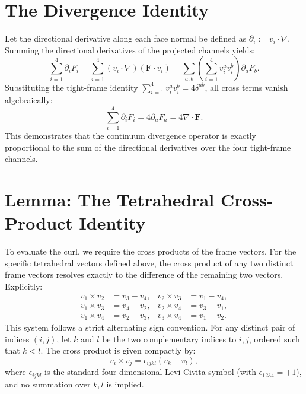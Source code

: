 \documentclass[11pt, letterpaper]{article}
\begin{document}
\section{The Divergence Identity}
Let the directional derivative along each face normal be defined as \(\partial_i := v_i \cdot \nabla\). Summing the directional derivatives of the projected channels yields:
\begin{equation}
    \sum_{i=1}^4 \partial_i F_i
    =
    \sum_{i=1}^4 (v_i \cdot \nabla)(\mathbf{F} \cdot v_i)
    =
    \sum_{a,b} \left( \sum_{i=1}^4 v_i^a v_i^b \right) \partial_a F_b.
\end{equation}
Substituting the tight-frame identity \(\sum_{i=1}^4 v_i^a v_i^b = 4\delta^{ab}\), all cross terms vanish algebraically:
\begin{equation}
    \sum_{i=1}^4 \partial_i F_i = 4 \partial_a F_a = 4 \nabla \cdot \mathbf{F}.
\end{equation}
This demonstrates that the continuum divergence operator is exactly proportional to the sum of the directional derivatives over the four tight-frame channels.

\section{Lemma: The Tetrahedral Cross-Product Identity}
To evaluate the curl, we require the cross products of the frame vectors. For the specific tetrahedral vectors defined above, the cross product of any two distinct frame vectors resolves exactly to the difference of the remaining two vectors. Explicitly:
\begin{align*}
    v_1 \times v_2 &= v_3 - v_4, & v_2 \times v_3 &= v_1 - v_4, \\
    v_1 \times v_3 &= v_4 - v_2, & v_2 \times v_4 &= v_3 - v_1, \\
    v_1 \times v_4 &= v_2 - v_3, & v_3 \times v_4 &= v_1 - v_2.
\end{align*}
This system follows a strict alternating sign convention. For any distinct pair of indices \((i, j)\), let \(k\) and \(l\) be the two complementary indices to \(i,j\), ordered such that \(k<l\). The cross product is given compactly by:
\begin{equation}
    v_i \times v_j = \epsilon_{ijkl} (v_k - v_l),
\end{equation}
where \(\epsilon_{ijkl}\) is the standard four-dimensional Levi-Civita symbol (with \(\epsilon_{1234} = +1\)), and no summation over \(k,l\) is implied.
\end{document}
